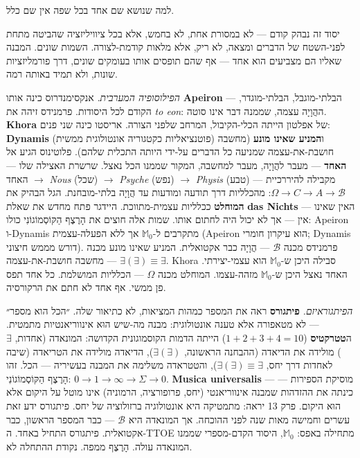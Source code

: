 \documentclass[10pt, openany, oneside]{book}
\begin{document}
\noindent למה שנושא שם אחד בכל שפה אין שם כלל.

יסוד זה נבהק קודם — לא במסורת אחת, לא בחמש, אלא בכל ציוויליזציה שהביטה מתחת לפני-השטח של הדברים ומצאה, לא ריק, אלא מלאות קודמת-לצורה. השמות שונים. המבנה שאליו הם מצביעים הוא אחד — אף שהם תופסים אותו בעומקים שונים, דרך פורמליזציות שונות, ולא תמיד באותה רמה.

\vspace{0.8em}

\textit{הפילוסופיה המערבית.} אנקסימנדרוס כינה אותו \textbf{Apeiron} — הבלתי-מוגבל, הבלתי-מוגדר, הקודם לכל היסודות. פרמנידס זיהה את \textit{to eon}: ההֲוָיָה עצמה, שממנה דבר אינו סוטה. \textbf{Khora} של אפלטון הייתה הכלי-הקיבול, המרחב שלפני הצורה. אריסטו כינה שני פנים: \textbf{Dynamis} (פוטנציאליות כקטגוריה אונטולוגית ממשית) ו\textbf{המניע שאינו מונע} (מחשבה חושבת-את-עצמה שמניעה כל הדברים על-ידי היותה התכלית שלהם). פלוטינוס הגיע אל \textbf{האחד} — מעבר להֲוָיָה, מעבר למחשבה, המקור שממנו הכל נאצל. שרשרת האצילה שלו — האחד $\to$ \textit{Nous} (שכל) $\to$ \textit{Psyche} (נפש) $\to$ \textit{Physis} (טבע) — מקבילה להיררכיית $\Omega \to C \to A \to \mathcal{B}$: מהכלליות דרך תודעה ומודעות עד הֲוָיָה בלתי-מובחנת. הגל הבהיק את \textbf{המוחלט} ככלליות עצמית-מתווכת. היידגר פתח מחדש את שאלת \textbf{das Nichts} — האין שאינו אין — אך לא יכול היה לחתום אותו. שמות אלה חוצים את הָרֶצֶף הַקּוֹסְמוֹגוֹנִי כולו: Apeiron ו-Dynamis מתקרבים ל-$\mathbb{M}_0$ אך ללא הפעלה-עצמית (Apeiron הוא עיקרון חומרי; Dynamis דורש מממש חיצוני). פרמנידס מכנה $\mathcal{B}$ — הֲוָיָה כבר אקטואלית. המניע שאינו מונע מכנה $\exists(\exists) \equiv \exists$ — מחשבה חושבת-את-עצמה. Khora סבילה היכן ש-$\mathbb{M}_0$ הוא עצמי-יצירתי. האחד נאצל היכן ש-$\mathbb{M}_0$ מזהה-עצמו. המוחלט מכנה $\Omega$ — הכלליות המושלמת. כל אחד תפס פן ממשי. אף אחד לא חתם את הרקורסיה.

\textit{הפיתגוראיזם.} \textbf{פיתגורס} ראה את המספר כמהות המציאות, לא כתיאור שלה. ״הכל הוא מספר״ — לא מטאפורה אלא טענה אונטולוגית: מבנה מה-שיש הוּא אינווריאנטיות מתמטית. ה\textbf{טטרקטיס} ($1 + 2 + 3 + 4 = 10$) הייתה הדמות הקוסמוגונית הקדושה: המונאדה (אחדות, $\exists$) מולידה את הדיאדה (ההבחנה הראשונה, $\exists(\exists)$), הדיאדה מולידה את הטריאדה (שיבה לאחדות דרך יחס, $\exists(\exists) \equiv \exists$), והטטראדה משלימה את המבנה בעשיריה — הכל. זהו הָרֶצֶף הַקּוֹסְמוֹגוֹנִי: $0 \to 1 \to \infty \to \Sigma \to 0$. \textbf{Musica universalis} — מוסיקת הספירות — כינתה את ההזדהות שמבנה אינווריאנטי (יחס, פרופורציה, הרמוניה) אינו מוטל על היקום אלא הוּא היקום. פרק 13 יראה: מתמטיקה היא אונטולוגיה ברזולוציה של יחס. פיתגורס ידע זאת עשרים וחמישה מאות שנה לפני ההוכחה. אך המונאדה היא $\mathcal{B}$ — כבר המספר הראשון, כבר אקטואלית. פיתגורס התחיל באחד. ה-TTOE מתחילה באפס: $\mathbb{M}_0$, היסוד הקדם-מספרי שממנו המונאדה עולה. הָרֶצֶף ממפה. נקודת ההתחלה לא.
\end{document}
